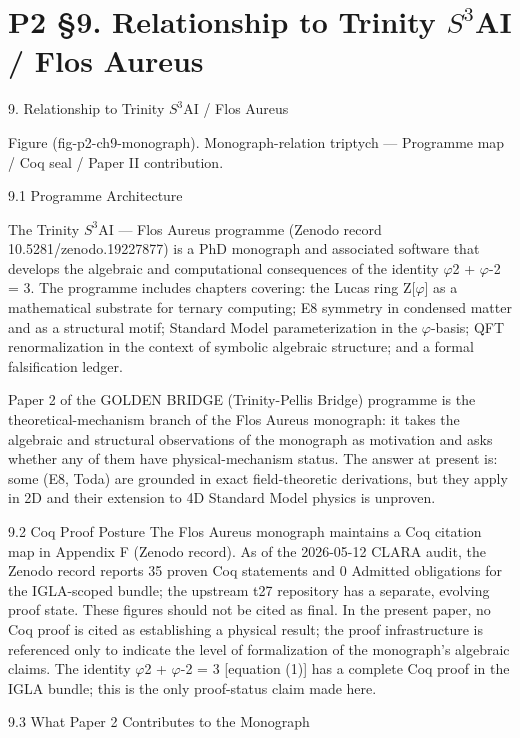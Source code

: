 
\section{P2 §9. Relationship to Trinity $S^{3}$AI / Flos Aureus}

9. Relationship to Trinity $S^{3}$AI / Flos Aureus

        Figure (fig-p2-ch9-monograph). Monograph-relation triptych --- Programme map / Coq seal /
                                         Paper II contribution.

  9.1 Programme Architecture

  The Trinity $S^{3}$AI --- Flos Aureus programme (Zenodo record 10.5281/zenodo.19227877)
  is a PhD monograph and associated software that develops the algebraic and
  computational consequences of the identity $\varphi$2 + $\varphi$-2 = 3. The programme includes
  chapters covering: the Lucas ring Z[$\varphi$] as a mathematical substrate for ternary
  computing; E8 symmetry in condensed matter and as a structural motif; Standard
  Model parameterization in the $\varphi$-basis; QFT renormalization in the context of symbolic
  algebraic structure; and a formal falsification ledger.

  Paper 2 of the GOLDEN BRIDGE (Trinity-Pellis Bridge) programme is the theoretical-mechanism branch of the Flos
  Aureus monograph: it takes the algebraic and structural observations of the monograph
  as motivation and asks whether any of them have physical-mechanism status. The
  answer at present is: some (E8, Toda) are grounded in exact field-theoretic derivations,
  but they apply in 2D and their extension to 4D Standard Model physics is unproven.

  9.2 Coq Proof Posture
  The Flos Aureus monograph maintains a Coq citation map in Appendix F (Zenodo
  record). As of the 2026-05-12 CLARA audit, the Zenodo record reports 35 proven Coq
  statements and 0 Admitted obligations for the IGLA-scoped bundle; the upstream t27
  repository has a separate, evolving proof state. These figures should not be cited as
  final. In the present paper, no Coq proof is cited as establishing a physical result; the
  proof infrastructure is referenced only to indicate the level of formalization of the
  monograph's algebraic claims. The identity $\varphi$2 + $\varphi$-2 = 3 [equation (1)] has a complete
  Coq proof in the IGLA bundle; this is the only proof-status claim made here.

  9.3 What Paper 2 Contributes to the Monograph